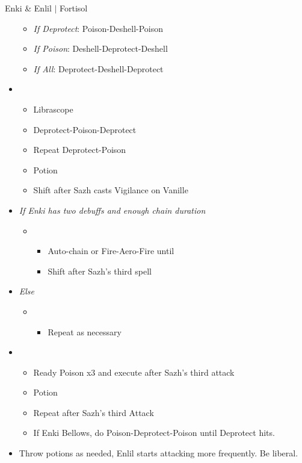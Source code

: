 \begin{battle}{Enki \& Enlil $|$ Fortisol}
\begin{multicols}{2}
\begin{itemize}
        \begin{itemize}
            \item \textit{If Deprotect}: Poison-Deshell-Poison
            \item \textit{If Poison}: Deshell-Deprotect-Deshell
            \item \textit{If All}: Deprotect-Deshell-Deprotect
        \end{itemize}
    \item \second
    \begin{itemize}
        \item Librascope
        \item Deprotect-Poison-Deprotect
        \item Repeat Deprotect-Poison
        \item Potion
        \item Shift after Sazh casts Vigilance on Vanille
    \end{itemize}
    \item \textit{If Enki has two debuffs and enough chain duration}
    \begin{itemize}
        \item \fourth
        \begin{itemize}
            \item Auto-chain or Fire-Aero-Fire until \stagger
            \item Shift after Sazh's third spell
        \end{itemize}
    \end{itemize}
    \item \textit{Else}
    \begin{itemize}
        \item \fifth
        \begin{itemize}
            \item Repeat as necessary
        \end{itemize}
    \end{itemize}
    \item \sixth
    \begin{itemize}
        \item Ready Poison x3 and execute after Sazh's third attack
        \item Potion
        \item Repeat after Sazh's third Attack
        \item If Enki Bellows, do Poison-Deprotect-Poison until Deprotect hits.
    \end{itemize}
    \item Throw potions as needed, Enlil starts attacking more frequently. Be liberal.

\end{itemize}
\end{multicols}
\end{battle}
